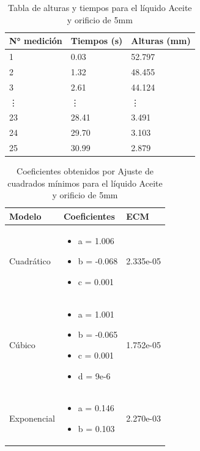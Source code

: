 \documentclass{article}
\begin{document}
\begin{table}[H]
    \begin{center}
        \begin{tabular}{ | m{2cm} | m{2cm} | m{2cm} | }
            \hline N° medición & Tiempos (s) & Alturas (mm) \\ 
            \hline 1 & 0.03 & 52.797 \\
            \hline 2 & 1.32 & 48.455 \\
            \hline 3 & 2.61 & 44.124 \\
            \hline \vdots & \vdots & \vdots \\            
            \hline 23 & 28.41 & 3.491 \\
            \hline 24 & 29.70 & 3.103 \\
            \hline 25 & 30.99 & 2.879 \\
            \hline
        \end{tabular}
    \end{center}
    \caption{Tabla de alturas y tiempos para el líquido Aceite y orificio de 5mm}
\end{table}

\begin{table}[h]
    \begin{center}
        \begin{tabular}{ | m{2cm} | m{5cm} | m{2cm} | }
            \hline Modelo & Coeficientes & ECM \\ 
            \hline Cuadrático & \begin{itemize}
                \item a = 1.006
                \item b = -0.068
                \item c = 0.001
            \end{itemize} & 2.335e-05 \\
            \hline Cúbico & \begin{itemize}
                \item a = 1.001
                \item b = -0.065
                \item c = 0.001
                \item d = 9e-6
            \end{itemize} & 1.752e-05 \\
            \hline Exponencial & \begin{itemize}
                \item a = 0.146
                \item b = 0.103
            \end{itemize} & 2.270e-03 \\
            \hline
        \end{tabular}
    \end{center}
    \caption{Coeficientes obtenidos por Ajuste de cuadrados mínimos para el líquido Aceite y orificio de 5mm}
\end{table}
\end{document}
